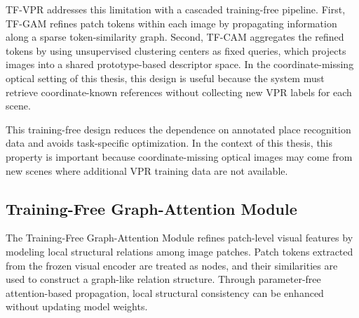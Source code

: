 TF-VPR addresses this limitation with a cascaded training-free pipeline. First, TF-GAM refines patch tokens within each image by propagating information along a sparse token-similarity graph. Second, TF-CAM aggregates the refined tokens by using unsupervised clustering centers as fixed queries, which projects images into a shared prototype-based descriptor space. In the coordinate-missing optical setting of this thesis, this design is useful because the system must retrieve coordinate-known references without collecting new VPR labels for each scene.

This training-free design reduces the dependence on annotated place recognition data and avoids task-specific optimization. In the context of this thesis, this property is important because coordinate-missing optical images may come from new scenes where additional VPR training data are not available.

\subsection{Training-Free Graph-Attention Module}
The Training-Free Graph-Attention Module refines patch-level visual features by modeling local structural relations among image patches. Patch tokens extracted from the frozen visual encoder are treated as nodes, and their similarities are used to construct a graph-like relation structure. Through parameter-free attention-based propagation, local structural consistency can be enhanced without updating model weights.

